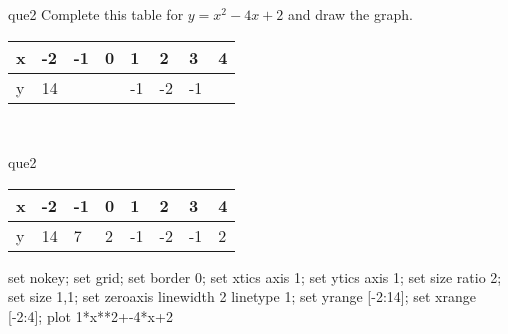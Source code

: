 \documentclass[13.5pt, varwidth=true]{beamer}
\begin{document}
\begin{frame}[shrink=19,fragile]
	\begin{beamercolorbox}[rounded=true, left, shadow=true,wd=14.8cm]{que2}
		 Complete this table for $y = x^{2} - 4x + 2$ and draw the graph. \\[0.3cm] \renewcommand{\arraystretch}{1.2}\begin{tabular}{|C|C|C|C|C|C|C|C|} \hline x & -2 & -1 & 0 & 1 & 2 & 3 & 4 \\ \hline y & 14 &  &  & -1 & -2 & -1 & \\ \hline \end{tabular}\\[0.3cm]
	\end{beamercolorbox}
\end{frame}
\begin{frame}[shrink=19,fragile]
	\begin{beamercolorbox}[rounded=true, left, shadow=true,wd=14.8cm]{que2}
		\renewcommand{\arraystretch}{1.2}\begin{tabular}{|C|C|C|C|C|C|C|C|} \hline x & -2 & -1 & 0 & 1 & 2 & 3 & 4 \\ \hline y & 14 & 7 & 2 & -1 & -2 & -1 & 2\\ \hline \end{tabular}\begin{gnuplot}[terminal=pdf] set nokey; set grid; set border 0; set xtics axis 1; set ytics axis 1; set size ratio 2; set size 1,1; set zeroaxis linewidth 2 linetype 1; set yrange [-2:14]; set xrange [-2:4]; plot 1*x**2+-4*x+2 \end{gnuplot}
	\end{beamercolorbox}
\end{frame}
\end{document}
